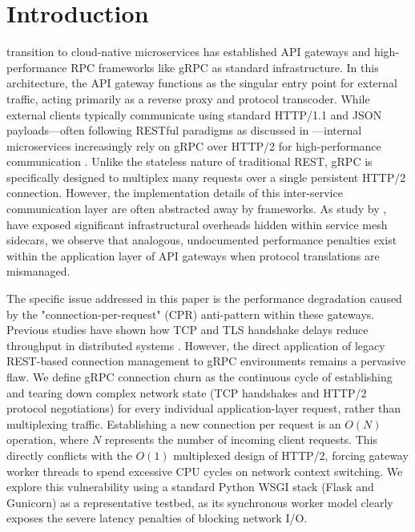 \documentclass{ieeeaccess}
\begin{document}
\titlepgskip=-21pt

\maketitle

\section{Introduction}
\label{sec:introduction}

 transition to cloud-native microservices has established API gateways and high-performance RPC frameworks like gRPC as standard infrastructure. In this architecture, the API gateway functions as the singular entry point for external traffic, acting primarily as a reverse proxy and protocol transcoder. While external clients typically communicate using standard HTTP/1.1 and JSON payloads—often following RESTful paradigms as discussed in \cite{martin2022online}—internal microservices increasingly rely on gRPC over HTTP/2 for high-performance communication \cite{Ventre2018SDNAAA}. Unlike the stateless nature of traditional REST, gRPC is specifically designed to multiplex many requests over a single persistent HTTP/2 connection. However, the implementation details of this inter-service communication layer are often abstracted away by frameworks. As study by \cite{zhu2023dissecting}, have exposed significant infrastructural overheads hidden within service mesh sidecars, we observe that analogous, undocumented performance penalties exist within the application layer of API gateways when protocol translations are mismanaged.

The specific issue addressed in this paper is the performance degradation caused by the "connection-per-request" (CPR) anti-pattern within these gateways. Previous studies have shown how TCP and TLS handshake delays reduce throughput in distributed systems \cite{Guo2020StatefulTCPANAA}. However, the direct application of legacy REST-based connection management to gRPC environments remains a pervasive flaw. We define gRPC connection churn as the continuous cycle of establishing and tearing down complex network state (TCP handshakes and HTTP/2 protocol negotiations) for every individual application-layer request, rather than multiplexing traffic. Establishing a new connection per request is an $O(N)$ operation, where $N$ represents the number of incoming client requests. This directly conflicts with the $O(1)$ multiplexed design of HTTP/2, forcing gateway worker threads to spend excessive CPU cycles on network context switching. We explore this vulnerability using a standard Python WSGI stack \cite{wsgi-pep} (Flask and Gunicorn) as a representative testbed, as its synchronous worker model clearly exposes the severe latency penalties of blocking network I/O.
\end{document}
